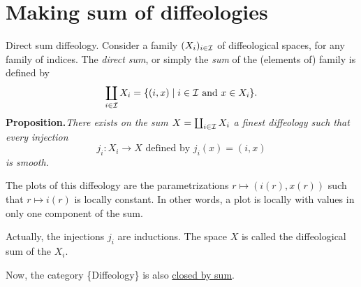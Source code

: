 \section{Making sum of diffeologies}

\begin{Article}{Direct sum diffeology.}
  Consider a family $(X_i)_{i \in \mathcal{I}}$ of diffeological spaces,
  for any family of indices.
  The \emph{direct sum},
  or simply the \emph{sum} of the (elements of) family is defined by
  $$%
    \coprod_{i \in \cI} X_i = \{(i,x) \mid i \in \cI \text{ and } x \in X_i \}.
    $$%
  \textbf{Proposition.}{\itshape There exists on the sum $X= \coprod_{i \in \mathcal{I}} X_i$ a finest diffeology such that every injection
  $$%
    j_i \colon X_i \to X \text{ defined by } j_i(x) = (i,x)
    $$%
  is smooth.}
  
  The plots of this diffeology are the parametrizations $r \mapsto (i(r),x(r))$ such that $r \mapsto i(r)$ is locally constant.
  In other words,
  a plot is locally with values in only one component of the sum.
  
  Actually,
  the injections $j_i$ are inductions.
  The space $X$ is called the diffeological sum of the $X_i$.
  
  Now,
  the category \{Diffeology\} is also \uline{closed by sum}.
\end{Article}

